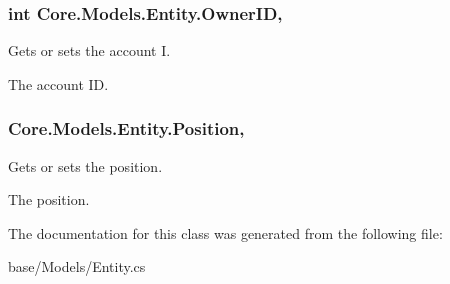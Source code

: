\subsubsection[{Owner\+I\+D}]{\setlength{\rightskip}{0pt plus 5cm}int Core.\+Models.\+Entity.\+Owner\+I\+D\hspace{0.3cm}{\ttfamily [get]}, {\ttfamily [set]}}\label{classCore_1_1Models_1_1Entity_adf44e0bd8e2a08cf13fcd6a783f783e5}


Gets or sets the account I. 

The account I\+D.\hypertarget{classCore_1_1Models_1_1Entity_a0c56e42b49dbe385d0e201a42ab1feea}{}
\subsubsection[{Position}]{ Core.\+Models.\+Entity.\+Position\hspace{0.3cm}{\ttfamily [get]}, {\ttfamily [set]}}\label{classCore_1_1Models_1_1Entity_a0c56e42b49dbe385d0e201a42ab1feea}


Gets or sets the position. 

The position.

The documentation for this class was generated from the following file\+:\begin{DoxyCompactItemize}
\item 
base/\+Models/Entity.\+cs\end{DoxyCompactItemize}
